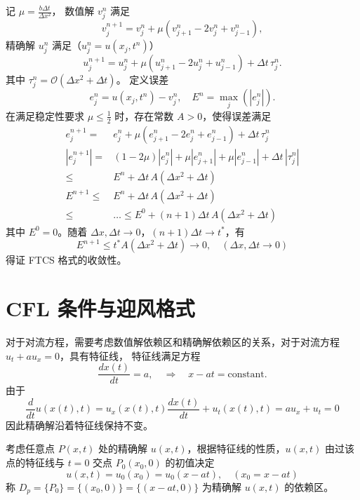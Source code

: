 \begin{solution*}
    记 $\mu = \frac{b \Delta t}{\Delta x^2}$，
    数值解 $v_j^n$ 满足
    \[
        v_j^{n+1} = v_j^n + \mu (v_{j+1}^n - 2 v_j^n + v_{j-1}^n),
    \]
    精确解 $u_j^n$ 满足（$u_j^n = u(x_j,t^n)$）
    \[
        u_j^{n+1} = u_j^n + \mu (u_{j+1}^n - 2 u_j^n + u_{j-1}^n) + \Delta t\, \tau_j^n.
    \]
    其中 $\tau_j^n = \mathcal{O}(\Delta x^2 + \Delta t)$。
    定义误差
    \[
        e_j^n = u(x_j,t^n) - v_j^n,\quad E^n = \max_j(|e_j^n|).
    \]
    在满足稳定性要求 $\mu \le \frac12$ 时，存在常数 $A>0$，使得误差满足
    \begin{align*}
        e_j^{n+1} ={}   & e_j^n + \mu (e_{j+1}^n - 2 e_j^n + e_{j-1}^n) + \Delta t\, \tau_j^n          \\
        |e_j^{n+1}| ={} & (1-2\mu) |e_j^n| + \mu |e_{j+1}^n| + \mu |e_{j-1}^n| + \Delta t\, |\tau_j^n| \\
        \le{}           & E^n + \Delta t\, A(\Delta x^2 + \Delta t)                                    \\
        E^{n+1} \le{}   & E^n + \Delta t\, A(\Delta x^2 + \Delta t)                                    \\
        \le{}           & \dots \le E^0 + (n+1)\Delta t\, A(\Delta x^2 + \Delta t)
    \end{align*}
    其中 $E^0 = 0$。随着 $\Delta x,\Delta t \to 0$，$(n+1) \Delta t \to t^*$，有
    \[
        E^{n+1} \le t^* A(\Delta x^2 + \Delta t) \to 0, \quad (\Delta x,\Delta t \to 0)
    \]
    得证 FTCS 格式的收敛性。
\end{solution*}





\section{CFL 条件与迎风格式}

对于对流方程，需要考虑数值解依赖区和精确解依赖区的关系，对于对流方程 $u_t + a u_x = 0$，具有特征线，
特征线满足方程
\[
    \frac{d x(t)}{dt} = a, \quad \Rightarrow \quad x - a t = \text{constant}.
\]
由于
\[
    \frac{d}{dt} u(x(t),t) = u_x(x(t),t) \frac{d x(t)}{dt} + u_t(x(t),t) = a u_x + u_t = 0
\]
因此精确解沿着特征线保持不变。

考虑任意点 $P(x,t)$ 处的精确解 $u(x,t)$，根据特征线的性质，$u(x,t)$ 由过该点的特征线与 $t=0$ 交点 $P_0(x_0,0)$ 的初值决定
\[
    u(x,t) = u_0(x_0) = u_0(x - a t),\quad (x_0 = x - a t)
\]
称 $D_p = \{P_0\} = \{(x_0,0)\} = \{(x - a t,0)\}$ 为精确解 $u(x,t)$ 的依赖区。

